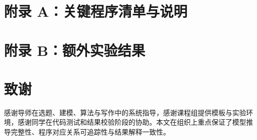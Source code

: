 \documentclass[openany]{./MathematicalModelCaseStudyReport}
\let\cleardoublepage\clearpage
\numberwithin{algorithm}{chapter}
\begin{document}
\clearpage{\pagestyle{empty}\cleardoublepage}
\chapter*{附录 A：关键程序清单与说明}


\clearpage{\pagestyle{empty}\cleardoublepage}
\chapter*{附录 B：额外实验结果}


\clearpage{\pagestyle{empty}\cleardoublepage}
\chapter*{致谢}
感谢导师在选题、建模、算法与写作中的系统指导，感谢课程组提供模板与实验环境，感谢同学在代码测试和结果校验阶段的协助。本文在组织上重点保证了模型推导完整性、程序对应关系可追踪性与结果解释一致性。
\end{document}

